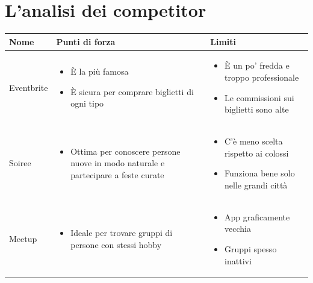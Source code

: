 \section{L'analisi dei competitor}
\begin{table}[h]
    \centering
    \begin{tabular}{|p{3cm}|p{5cm}|p{5cm}|} 
        \hline
        \textbf{Nome} & \textbf{Punti di forza} & \textbf{Limiti} \\
        \hline
        
        Eventbrite & 
        \begin{itemize}[nosep, leftmargin=*]
            \item È la più famosa
            \item È sicura per comprare biglietti di ogni tipo
        \end{itemize} & 
        \begin{itemize}[nosep, leftmargin=*]
            \item È un po' fredda e troppo professionale
            \item Le commissioni sui biglietti sono alte
        \end{itemize} \\ \hline
        
        Soiree & 
        \begin{itemize}[nosep, leftmargin=*]
            \item Ottima per conoscere persone nuove in modo naturale e partecipare a feste curate
        \end{itemize} & 
        \begin{itemize}[nosep, leftmargin=*]
            \item C'è meno scelta rispetto ai colossi
            \item Funziona bene solo nelle grandi città
        \end{itemize} \\ \hline
      
        Meetup & 
        \begin{itemize}[nosep, leftmargin=*]
            \item Ideale per trovare gruppi di persone con stessi hobby
        \end{itemize} & 
        \begin{itemize}[nosep, leftmargin=*]
            \item App graficamente vecchia
            \item Gruppi spesso inattivi
        \end{itemize} \\ \hline


\end{tabular}
\end{table}
